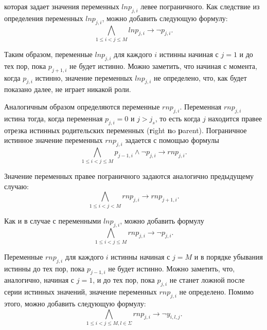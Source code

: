 которая задает значения переменных $\mathit{lnp}_{j,i}$ левее пограничного.
Как следствие из определения переменных $\mathit{lnp}_{j,i}$, можно добавить следующую формулу:
\begin{equation*}
\bigwedge_{1 \leq i < j \leq M} \mathit{lnp}_{j,i} \rightarrow \neg p_{j,i}.
\end{equation*}

Таким образом, переменные $\mathit{lnp}_{j,i}$ для каждого $i$ истинны начиная с $j = 1$ и до тех пор, пока $p_{j + 1, i}$ не будет истинно.
Можно заметить, что начиная с момента, когда $p_{j,i}$ истинно, значение переменных $\mathit{lnp}_{j,i}$ не определено, что, как будет показано далее, не играет никакой роли.

Аналогичным образом определяются переменные $\mathit{rnp}_{j,i}$.
Переменная $\mathit{rnp}_{j,i}$ истина тогда, когда переменная $p_{j,i} = 0$ и $j > j_{s}$, то есть когда $j$ находится правее отрезка истинных родительских переменных (\textbf{r}ight \textbf{n}o \textbf{p}arent).
Пограничное истинное значение переменных $\mathit{rnp}_{j,i}$ задается с помощью формулы
\begin{equation*}
\bigwedge_{1 \leq i < j \leq M} p_{j - 1,i} \wedge \neg p_{j, i} \rightarrow \mathit{rnp}_{j,i}.
\end{equation*}

Значение переменных правее пограничного задаются аналогично предыдущему случаю:
\begin{equation*}
\bigwedge_{1 \leq i < j < M} \mathit{rnp}_{j,i} \rightarrow \mathit{rnp}_{j + 1, i}.
\end{equation*}

Как и в случае с переменными $\mathit{lnp}_{j,i}$, можно добавить формулу
\begin{equation*}
\bigwedge_{1 \leq i < j \leq M} \mathit{rnp}_{j,i} \rightarrow \neg p_{j,i}.
\end{equation*}

Переменные $\mathit{rnp}_{j,i}$ для каждого $i$ истинны начиная с $j = M$ и в порядке убывания истинны до тех пор, пока $p_{j - 1, i}$ не будет истинно.
Можно заметить, что, аналогично, начиная с $j = 1$, и до тех пор, пока $p_{j,i}$ не станет ложной после серии истинных значений, значение переменных $\mathit{rnp}_{j,i}$ не определено.
Помимо этого, можно добавить следующую формулу:
\begin{equation*}
\bigwedge_{1 \leq i < j \leq M, l \in \Sigma} \mathit{rnp}_{j,i} \rightarrow \neg y_{i,l,j}.
\end{equation*}

